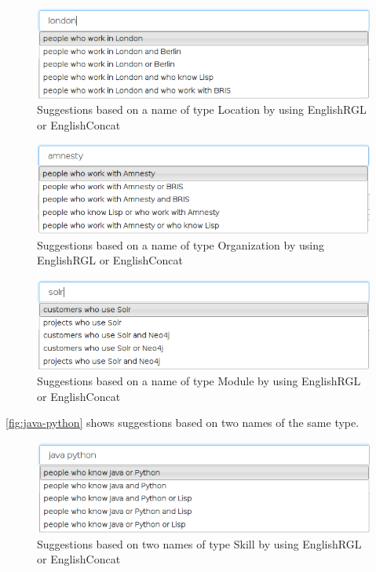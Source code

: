 \begin{figure}[H]
\includegraphics[scale=0.6,keepaspectratio,valign=t]{./gfx/london.png}
\caption{Suggestions based on a name of type Location by using EnglishRGL or EnglishConcat\label{fig:name-location}}
\end{figure}

\begin{figure}[H]
\includegraphics[scale=0.6,keepaspectratio,valign=t]{./gfx/amnesty.png}
\caption{Suggestions based on a name of type Organization by using EnglishRGL or EnglishConcat\label{fig:name-organization}}
\end{figure}

\begin{figure}[H]
\includegraphics[scale=0.6,keepaspectratio,valign=t]{./gfx/solr.png}
\caption{Suggestions based on a name of type Module by using EnglishRGL or EnglishConcat\label{fig:name-module}}
\end{figure}

\autoref{fig:java-python} shows suggestions based on two names of the same type.

\begin{figure}[H]
\includegraphics[scale=0.6,keepaspectratio,valign=t]{./gfx/java_python.png}
\caption{Suggestions based on two names  of type Skill by using EnglishRGL or EnglishConcat\label{fig:java-python}}
\end{figure}

